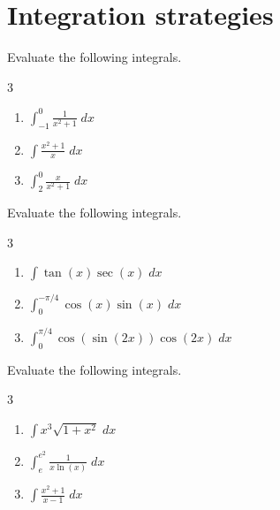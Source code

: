 \documentclass[../main.tex]{subfiles}
\begin{document}
 \section{Integration strategies}

\begin{exercise} \label{ex:choose-substitution}
  Evaluate the following integrals.

  \begin{multicols}{3}
    \begin{enumerate}[wide, label=(\alph*)]
      \item \(\int_{-1}^{0} \frac{1}{x^{2} + 1} \;dx\)
      \item \(\int \frac{x^{2} + 1}{x} \;dx\)
      \item \(\int_{2}^{0} \frac{x}{x^{2} + 1} \;dx\)
    \end{enumerate}
  \end{multicols}

\end{exercise}
\clearpage


\begin{exercise}
  Evaluate the following integrals.

  \begin{multicols}{3}
    \begin{enumerate}[wide, label=(\alph*)]
      \item \(\int \tan(x)\sec(x) \;dx\)
      \item \(\int_{0}^{-\pi/4} \cos(x)\sin(x) \;dx\)
      \item \(\int_{0}^{\pi/4} \cos(\sin(2x))\cos(2x) \;dx\)
    \end{enumerate}
  \end{multicols}

\end{exercise}
\clearpage

\begin{exercise}
  Evaluate the following integrals.

  \begin{multicols}{3}
    \begin{enumerate}[wide, label=(\alph*)]
      \item \(\int x^{3} \sqrt{1 + x^{2}} \;dx\)
      \item \(\int_{e}^{e^{2}} \frac{1}{x \ln(x)} \;dx\)
      \item \(\int \frac{x^{2} + 1}{x - 1} \;dx\)
    \end{enumerate}
  \end{multicols}

\end{exercise}
\clearpage
\end{document}
